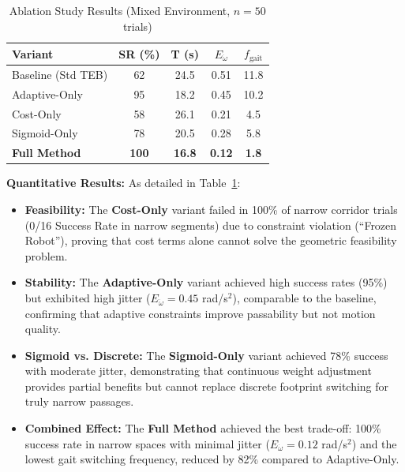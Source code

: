 \documentclass[lettersize,journal]{IEEEtran}
\begin{document}
\begin{table}[htbp]
\centering
\caption{Ablation Study Results (Mixed Environment, $n=50$ trials)}
\label{tab:ablation}
\begin{tabular}{l|cc|cc}
\hline
\textbf{Variant} & \textbf{SR (\%)} & \textbf{T (s)} & \textbf{$E_{\dot{\omega}}$} & \textbf{$f_{\text{gait}}$} \\
\hline
Baseline (Std TEB) & 62 & 24.5 & 0.51 & 11.8 \\
Adaptive-Only & 95 & 18.2 & 0.45 & 10.2 \\
Cost-Only & 58 & 26.1 & 0.21 & 4.5 \\
Sigmoid-Only & 78 & 20.5 & 0.28 & 5.8 \\
\textbf{Full Method} & \textbf{100} & \textbf{16.8} & \textbf{0.12} & \textbf{1.8} \\
\hline
\end{tabular}
\end{table}

\textbf{Quantitative Results:} As detailed in Table~\ref{tab:ablation}:
\begin{itemize}
\item \textbf{Feasibility:} The \textbf{Cost-Only} variant failed in 100\% of narrow corridor trials (0/16 Success Rate in narrow segments) due to constraint violation (``Frozen Robot''), proving that cost terms alone cannot solve the geometric feasibility problem.
\item \textbf{Stability:} The \textbf{Adaptive-Only} variant achieved high success rates (95\%) but exhibited high jitter ($E_{\dot{\omega}} = 0.45$ rad/s$^2$), comparable to the baseline, confirming that adaptive constraints improve passability but not motion quality.
\item \textbf{Sigmoid vs. Discrete:} The \textbf{Sigmoid-Only} variant achieved 78\% success with moderate jitter, demonstrating that continuous weight adjustment provides partial benefits but cannot replace discrete footprint switching for truly narrow passages.
\item \textbf{Combined Effect:} The \textbf{Full Method} achieved the best trade-off: 100\% success rate in narrow spaces with minimal jitter ($E_{\dot{\omega}} = 0.12$ rad/s$^2$) and the lowest gait switching frequency, reduced by 82\% compared to Adaptive-Only.
\end{itemize}
\end{document}
